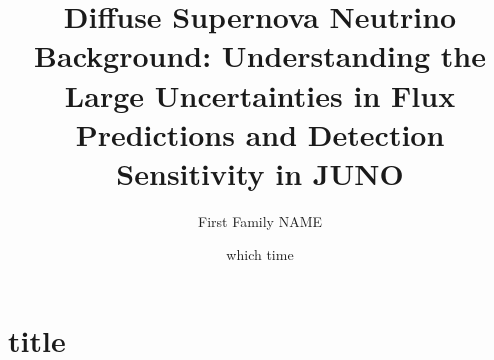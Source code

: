 \documentclass{beamer}
\title[This is Page Footer]{Diffuse Supernova Neutrino Background: Understanding the Large Uncertainties in Flux Predictions and Detection Sensitivity in JUNO}
\author{First Family NAME}
\date{which time}
\institute[]{Which Department \\ Which institute, Which Country \\ which.email@where}
\begin{document}
\frame{\titlepage}


\section[Outline]{}
\frame{
\setcounter{tocdepth}{1}
\tableofcontents}

\section[What]{title}
\end{document}
